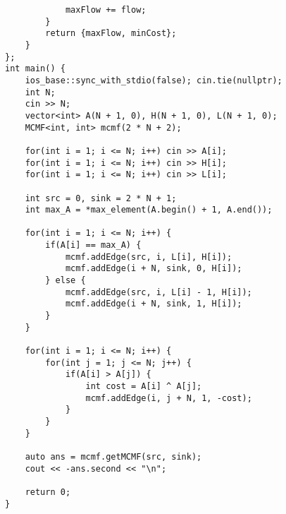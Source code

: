 \documentclass[landscape, 8pt, a4paper, oneside, twocolumn]{extarticle}
\begin{document}
\begin{verbatim}
            maxFlow += flow;
        }
        return {maxFlow, minCost};
    }
};
int main() {
    ios_base::sync_with_stdio(false); cin.tie(nullptr);
    int N;
    cin >> N;
    vector<int> A(N + 1, 0), H(N + 1, 0), L(N + 1, 0);
    MCMF<int, int> mcmf(2 * N + 2);

    for(int i = 1; i <= N; i++) cin >> A[i];
    for(int i = 1; i <= N; i++) cin >> H[i];
    for(int i = 1; i <= N; i++) cin >> L[i];

    int src = 0, sink = 2 * N + 1;
    int max_A = *max_element(A.begin() + 1, A.end());

    for(int i = 1; i <= N; i++) {
        if(A[i] == max_A) {
            mcmf.addEdge(src, i, L[i], H[i]);
            mcmf.addEdge(i + N, sink, 0, H[i]);
        } else {
            mcmf.addEdge(src, i, L[i] - 1, H[i]);
            mcmf.addEdge(i + N, sink, 1, H[i]);
        }
    }

    for(int i = 1; i <= N; i++) {
        for(int j = 1; j <= N; j++) {
            if(A[i] > A[j]) {
                int cost = A[i] ^ A[j];
                mcmf.addEdge(i, j + N, 1, -cost);
            }
        }
    }

    auto ans = mcmf.getMCMF(src, sink);
    cout << -ans.second << "\n";

    return 0;
}
    \end{verbatim}
\end{document}
